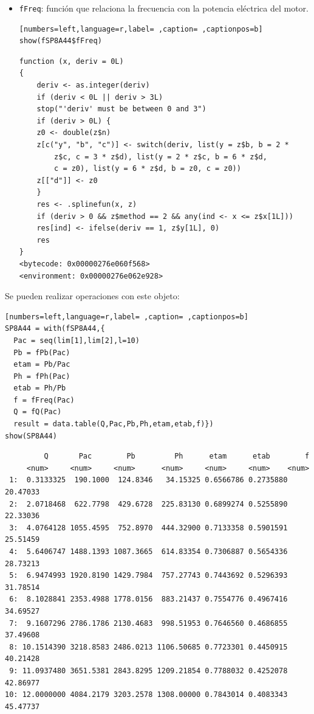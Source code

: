 \begin{itemize}
\begin{itemize}
\item \texttt{fFreq}: función que relaciona la frecuencia con la potencia eléctrica del motor.
\begin{lstlisting}[numbers=left,language=r,label= ,caption= ,captionpos=b]
show(fSP8A44$fFreq)
\end{lstlisting}

\begin{verbatim}
function (x, deriv = 0L) 
{
    deriv <- as.integer(deriv)
    if (deriv < 0L || deriv > 3L) 
	stop("'deriv' must be between 0 and 3")
    if (deriv > 0L) {
	z0 <- double(z$n)
	z[c("y", "b", "c")] <- switch(deriv, list(y = z$b, b = 2 * 
	    z$c, c = 3 * z$d), list(y = 2 * z$c, b = 6 * z$d, 
	    c = z0), list(y = 6 * z$d, b = z0, c = z0))
	z[["d"]] <- z0
    }
    res <- .splinefun(x, z)
    if (deriv > 0 && z$method == 2 && any(ind <- x <= z$x[1L])) 
	res[ind] <- ifelse(deriv == 1, z$y[1L], 0)
    res
}
<bytecode: 0x00000276e060f568>
<environment: 0x00000276e062e928>
\end{verbatim}
\end{itemize}

Se pueden realizar operaciones con este objeto:
\begin{lstlisting}[numbers=left,language=r,label= ,caption= ,captionpos=b]
SP8A44 = with(fSP8A44,{
  Pac = seq(lim[1],lim[2],l=10)
  Pb = fPb(Pac)
  etam = Pb/Pac
  Ph = fPh(Pac)
  etab = Ph/Pb
  f = fFreq(Pac)
  Q = fQ(Pac)
  result = data.table(Q,Pac,Pb,Ph,etam,etab,f)})
show(SP8A44)
\end{lstlisting}

\begin{verbatim}
	     Q       Pac        Pb         Ph      etam      etab        f
	 <num>     <num>     <num>      <num>     <num>     <num>    <num>
 1:  0.3133325  190.1000  124.8346   34.15325 0.6566786 0.2735880 20.47033
 2:  2.0718468  622.7798  429.6728  225.83130 0.6899274 0.5255890 22.33036
 3:  4.0764128 1055.4595  752.8970  444.32900 0.7133358 0.5901591 25.51459
 4:  5.6406747 1488.1393 1087.3665  614.83354 0.7306887 0.5654336 28.73213
 5:  6.9474993 1920.8190 1429.7984  757.27743 0.7443692 0.5296393 31.78514
 6:  8.1028841 2353.4988 1778.0156  883.21437 0.7554776 0.4967416 34.69527
 7:  9.1607296 2786.1786 2130.4683  998.51953 0.7646560 0.4686855 37.49608
 8: 10.1514390 3218.8583 2486.0213 1106.50685 0.7723301 0.4450915 40.21428
 9: 11.0937480 3651.5381 2843.8295 1209.21854 0.7788032 0.4252078 42.86977
10: 12.0000000 4084.2179 3203.2578 1308.00000 0.7843014 0.4083343 45.47737
\end{verbatim}


\end{itemize}
